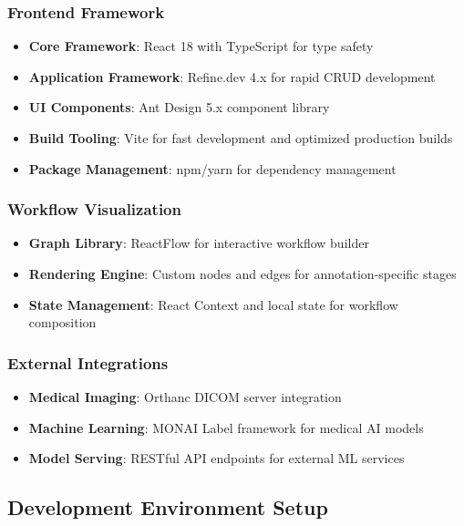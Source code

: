 \subsubsection{Frontend Framework}
\begin{itemize}
    \item \textbf{Core Framework}: React 18 with TypeScript for type safety
    \item \textbf{Application Framework}: Refine.dev 4.x for rapid CRUD development
    \item \textbf{UI Components}: Ant Design 5.x component library
    \item \textbf{Build Tooling}: Vite for fast development and optimized production builds
    \item \textbf{Package Management}: npm/yarn for dependency management
\end{itemize}

\subsubsection{Workflow Visualization}
\begin{itemize}
    \item \textbf{Graph Library}: ReactFlow for interactive workflow builder
    \item \textbf{Rendering Engine}: Custom nodes and edges for annotation-specific stages
    \item \textbf{State Management}: React Context and local state for workflow composition
\end{itemize}

\subsubsection{External Integrations}
\begin{itemize}
    \item \textbf{Medical Imaging}: Orthanc DICOM server integration
    \item \textbf{Machine Learning}: MONAI Label framework for medical AI models
    \item \textbf{Model Serving}: RESTful API endpoints for external ML services
\end{itemize}

\subsection{Development Environment Setup}

